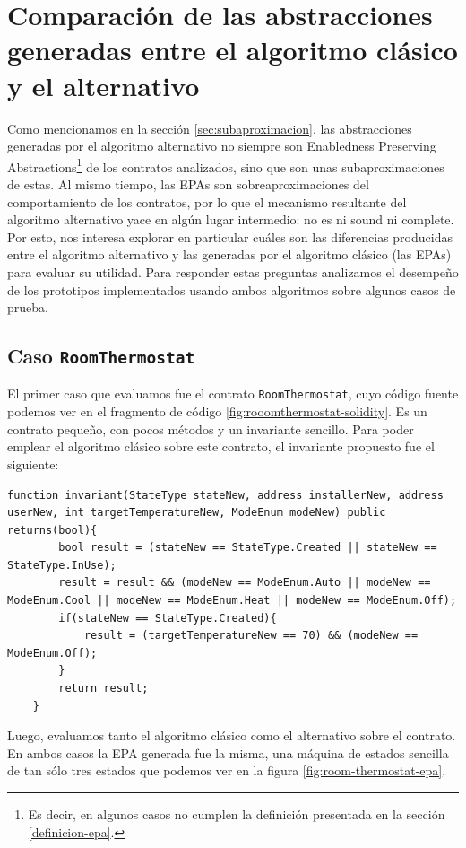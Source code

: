 \section{Comparación de las abstracciones generadas entre el algoritmo clásico y el alternativo}
Como mencionamos en la sección \ref{sec:subaproximacion}, las abstracciones generadas por el algoritmo alternativo no siempre son Enabledness Preserving Abstractions\footnote{Es decir, en algunos casos no cumplen la definición presentada en la sección \ref{definicion-epa}.} de los contratos analizados, sino que son unas subaproximaciones de estas.
Al mismo tiempo, las EPAs son sobreaproximaciones del comportamiento de los contratos, por lo que el mecanismo resultante del algoritmo alternativo yace en algún lugar intermedio: no es ni sound ni complete.
Por esto, nos interesa explorar en particular cuáles son las diferencias producidas entre el algoritmo alternativo y las generadas por el algoritmo clásico (las EPAs) para evaluar su utilidad.
Para responder estas preguntas analizamos el desempeño de los prototipos implementados usando ambos algoritmos sobre algunos casos de prueba.

\subsection{Caso \texttt{RoomThermostat}}
El primer caso que evaluamos fue el contrato \texttt{RoomThermostat}, cuyo código fuente podemos ver en el fragmento de código \ref{fig:rooomthermostat-solidity}.
Es un contrato pequeño, con pocos métodos y un invariante sencillo.
Para poder emplear el algoritmo clásico sobre este contrato, el invariante propuesto fue el siguiente:
\begin{lstlisting}[language=Solidity]
    function invariant(StateType stateNew, address installerNew, address userNew, int targetTemperatureNew, ModeEnum modeNew) public returns(bool){
        bool result = (stateNew == StateType.Created || stateNew == StateType.InUse);
        result = result && (modeNew == ModeEnum.Auto || modeNew == ModeEnum.Cool || modeNew == ModeEnum.Heat || modeNew == ModeEnum.Off);
        if(stateNew == StateType.Created){
            result = (targetTemperatureNew == 70) && (modeNew == ModeEnum.Off);
        }
        return result;
    }
\end{lstlisting}

Luego, evaluamos tanto el algoritmo clásico como el alternativo sobre el contrato.
En ambos casos la EPA generada fue la misma, una máquina de estados sencilla de tan sólo tres estados que podemos ver en la figura \ref{fig:room-thermostat-epa}.

